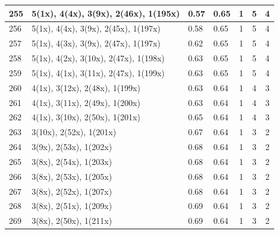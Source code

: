 \begin{small}
\begin{longtable}{|p{0.5cm}|p{9cm}|p{1.3cm}|p{1.3cm}|c|c|c|}
  255 & 5(1x), 4(4x), 3(9x), 2(46x), 1(195x) & \cellcolor{colorOK}  0.57 & \cellcolor{colorOK} 0.65 & 1 & 5 & \cellcolor{colorGood} 4 \\   \hline
  256 & 5(1x), 4(4x), 3(9x), 2(45x), 1(197x) & \cellcolor{colorOK}  0.58 & \cellcolor{colorOK} 0.65 & 1 & 5 & \cellcolor{colorGood} 4 \\   \hline
  257 & 5(1x), 4(3x), 3(9x), 2(47x), 1(197x) & \cellcolor{colorOK}  0.62 & \cellcolor{colorOK} 0.65 & 1 & 5 & \cellcolor{colorGood} 4 \\   \hline
  258 & 5(1x), 4(2x), 3(10x), 2(47x), 1(198x) & \cellcolor{colorOK}  0.63 & \cellcolor{colorOK} 0.65 & 1 & 5 & \cellcolor{colorGood} 4 \\   \hline
  259 & 5(1x), 4(1x), 3(11x), 2(47x), 1(199x) & \cellcolor{colorOK}  0.63 & \cellcolor{colorOK} 0.65 & 1 & 5 & \cellcolor{colorGood} 4 \\   \hline
  260 & 4(1x), 3(12x), 2(48x), 1(199x) & \cellcolor{colorOK}  0.63 & \cellcolor{colorOK} 0.64 & 1 & 4 & \cellcolor{colorGood} 3 \\   \hline
  261 & 4(1x), 3(11x), 2(49x), 1(200x) & \cellcolor{colorOK}  0.63 & \cellcolor{colorOK} 0.64 & 1 & 4 & \cellcolor{colorGood} 3 \\   \hline
  262 & 4(1x), 3(10x), 2(50x), 1(201x) & \cellcolor{colorBad}  0.65 & \cellcolor{colorBad} 0.64 & 1 & 4 & \cellcolor{colorGood} 3 \\   \hline
  263 & 3(10x), 2(52x), 1(201x) & \cellcolor{colorBad}  0.67 & \cellcolor{colorBad} 0.64 & 1 & 3 & \cellcolor{colorGood} 2 \\   \hline
  264 & 3(9x), 2(53x), 1(202x) & \cellcolor{colorBad}  0.68 & \cellcolor{colorBad} 0.64 & 1 & 3 & \cellcolor{colorGood} 2 \\   \hline
  265 & 3(8x), 2(54x), 1(203x) & \cellcolor{colorBad}  0.68 & \cellcolor{colorBad} 0.64 & 1 & 3 & \cellcolor{colorGood} 2 \\   \hline
  266 & 3(8x), 2(53x), 1(205x) & \cellcolor{colorBad}  0.68 & \cellcolor{colorBad} 0.64 & 1 & 3 & \cellcolor{colorGood} 2 \\   \hline
  267 & 3(8x), 2(52x), 1(207x) & \cellcolor{colorBad}  0.68 & \cellcolor{colorBad} 0.64 & 1 & 3 & \cellcolor{colorGood} 2 \\   \hline
  268 & 3(8x), 2(51x), 1(209x) & \cellcolor{colorBad}  0.69 & \cellcolor{colorBad} 0.64 & 1 & 3 & \cellcolor{colorGood} 2 \\   \hline
  269 & 3(8x), 2(50x), 1(211x) & \cellcolor{colorBad}  0.69 & \cellcolor{colorBad} 0.64 & 1 & 3 & \cellcolor{colorGood} 2 \\   \hline

\end{longtable}
\end{small}

